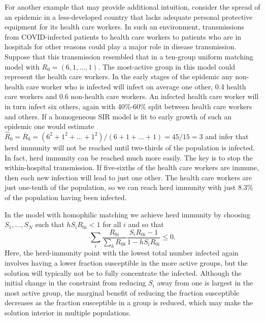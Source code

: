 \documentclass[11pt]{article}
\begin{document}
For another example that may provide additional 
intuition, consider the spread of an epidemic in
a less-developed country that lacks adequate 
personal protective equipment for its health care
workers. In such an environment, transmissions from
COVID-infected patients to health care workers to patients who are in hospitals for other reasons could play a major role in disease transmission. 
Suppose that this transmission resembled that in 
a ten-group uniform matching model with $R_0 = (6, 1, \ldots, 1).$ The most-active group in this model could represent the health care workers. In the early stages of the epidemic any non-health care worker who is infected will infect on average one other, 0.4 health care workers and 0.6 non-health care workers. An infected health care worker will in turn infect six others, again with 40\%-60\% split between health care workers and others. If a homogeneous SIR model is fit to early growth of such an epidemic one would estimate $\hat{R}_0 = \overline{R}_0 = (6^2 + 1^2 + \ldots + 1^2)/(6+1 + \ldots + 1) =  45/15 = 3$ and
infer that herd immunity will not be reached until two-thirds of the population is infected. In fact, herd immunity can be reached much more easily. The key is to stop the within-hospital transmission. If five-sixths of the health care workers are immune, then each new infection will lead to just one 
other. The health care workers are just one-tenth of the population, so we can reach herd immunity with
just 8.3\% of the population having been infected.

In the model with homophilic matching we achieve herd immunity by choosing $S_1, \ldots, S_N$ such that $h S_i R_{0i} < 1$ for all $i$ and so that
$$
\sum_i \frac{R_{0i}}{\sum_k R_{0k} } \frac{S_i R_{0i} - 1}{1 - h S_i R_{0i}} \leq 0.
$$
Here, the herd-immunity point with the lowest total number infected again involves having a lower fraction susceptible in the 
more active groups, but the solution will typically not be to fully concentrate the infected. Although the initial change in the 
constraint from reducing $S_i$ away from one is largest in the most active group, the marginal benefit of reducing the fraction 
susceptible decreases as the fraction susceptible in a group is reduced, which may make the solution interior in multiple populations. 
\end{document}

